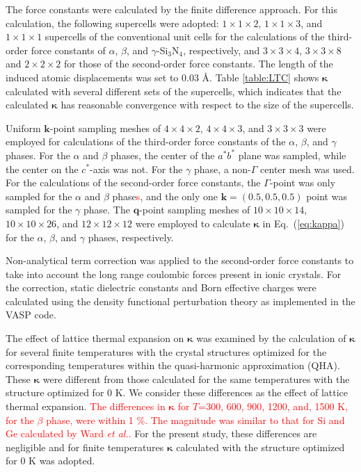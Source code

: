 \documentclass[twocolumn,amsmath,amssymb,a4paper,prb,superscriptaddress,floatfix]{revtex4-1}
\begin{document}
The force constants were calculated by the finite difference
approach\cite{wei-supercell}. For this calculation, the following supercells
were adopted: $1\times 1\times2$, $1\times 1\times3$, and $1\times 1\times1$
supercells of the conventional unit cells for the calculations of the
third-order force constants of $\alpha$, $\beta$, and $\gamma$-Si$_3$N$_4$,
respectively, and $3\times 3\times4$, $3\times 3\times8$ and $2\times 2\times2$
for those of the second-order force constants.  The length of the induced atomic
displacements was set to 0.03 \AA.  Table \ref{table:LTC} shows
$\boldsymbol{\kappa}$ calculated with several different sets of the supercells,
which indicates that the calculated $\boldsymbol{\kappa}$ has reasonable
convergence with respect to the size of the supercells. 

Uniform $\mathbf{k}$-point sampling meshes of $4\times 4\times 2$, $4\times
4\times 3$, and $3\times 3\times 3$ were employed for calculations of the
third-order force constants of the $\alpha$, $\beta$, and $\gamma$ phases. For
the $\alpha$ and $\beta$ phases, the center of the $a^*b^*$ plane was sampled,
while the center on the $c^*$-axis was not. For the $\gamma$ phase, a non-$\Gamma$
center mesh was used. For the calculations of the second-order force constants,
the $\Gamma$-point was only sampled for the $\alpha$ and $\beta$
phase\textcolor{red}{s}, and the
only one $\mathbf{k}=(0.5, 0.5, 0.5)$ point was sampled for the $\gamma$ phase.
The $\mathbf{q}$-point sampling meshes of $10\times 10\times 14$, $10\times
10\times 26$, and $12\times 12\times 12$ were employed to calculate
$\boldsymbol{\kappa}$ in Eq.~(\ref{eq:kappa}) for the $\alpha$, $\beta$, and
$\gamma$ phases, respectively.

Non-analytical term correction\cite{wang} was applied to the second-order force
constants to take into account the long range coulombic forces present in ionic
crystals. For the correction, static dielectric constants and Born effective
charges were calculated using the density functional perturbation theory
as implemented in the VASP code\cite{vasp-lepsiron,lepsiron}.

The effect of lattice thermal expansion on $\boldsymbol{\kappa}$ was examined
by the calculation of $\boldsymbol{\kappa}$ for several finite
temperatures with the crystal structures optimized for the
corresponding temperatures within the quasi-harmonic approximation
(QHA)\cite{dove-p76}. These $\boldsymbol{\kappa}$ were different from those
calculated for the same temperatures with the structure
optimized for 0 K. We consider these differences as the effect of lattice
thermal expansion. \textcolor{red}{The differences in $\boldsymbol{\kappa}$ for $T$=300, 600,
900, 1200, and, 1500 K, for the $\beta$ phase, were within 1 \%. The magnitude
was similar to that for Si and Ge calculated by Ward {\it{et
al.}}\cite{ward-ltc}.} 
For the present study, these differences are negligible and
for finite temperatures $\boldsymbol{\kappa}$ calculated with the
structure optimized for 0 K was adopted.
\end{document}
